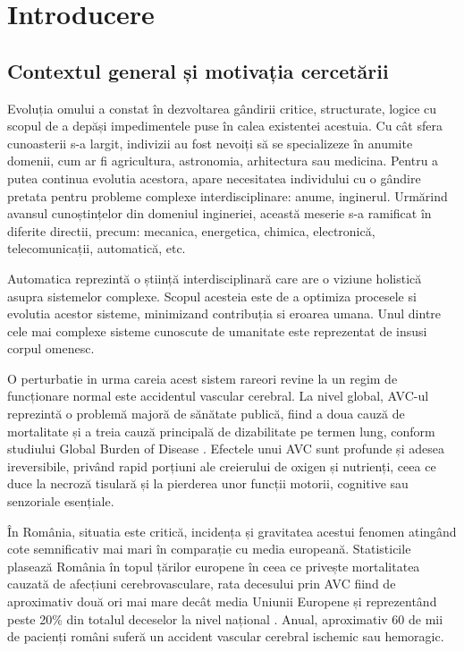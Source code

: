 \chapter{Introducere}
\section{Contextul general și motivația cercetării}
\hspace{0.75cm}Evoluția omului a constat în dezvoltarea gândirii critice, structurate, logice cu scopul de a depăși 
impedimentele puse în calea existentei acestuia. 
Cu cât sfera cunoasterii s-a largit, indivizii au fost nevoiți să se specializeze în anumite domenii,
cum ar fi agricultura, astronomia, arhitectura sau medicina. 
Pentru a putea continua evolutia acestora, apare necesitatea individului cu o 
gândire pretata pentru probleme complexe interdisciplinare: anume, inginerul. 
Urmărind avansul cunoștințelor din domeniul ingineriei, această 
meserie s-a ramificat în diferite directii, precum: mecanica, energetica, chimica, electronică, telecomunicații, 
automatică, etc.

\hspace{0.75cm}Automatica reprezintă o știință interdisciplinară care are o viziune holistică asupra sistemelor complexe. 
Scopul acesteia este de a optimiza procesele si evolutia acestor sisteme, minimizand contribuția si eroarea umana.
Unul dintre cele mai complexe sisteme cunoscute de umanitate este reprezentat de insusi corpul omenesc. 

\hspace{0.75cm}O perturbatie in urma careia acest sistem rareori revine la un regim de funcționare normal  
este accidentul vascular cerebral. La nivel global, AVC-ul reprezintă o problemă majoră de sănătate publică, 
fiind a doua cauză de mortalitate și a treia cauză principală de dizabilitate pe termen lung, conform studiului 
Global Burden of Disease \cite{gbd2021}. Efectele unui AVC sunt profunde și adesea ireversibile, 
privând rapid porțiuni ale creierului de oxigen și nutrienți,
ceea ce duce la necroză tisulară și la pierderea unor funcții motorii, cognitive sau senzoriale esențiale.

\hspace{0.75cm}În România, situatia este critică, incidența și gravitatea acestui fenomen atingând cote semnificativ
mai mari  în comparație cu media europeană. Statisticile plasează România în topul țărilor europene în ceea ce 
privește mortalitatea cauzată de afecțiuni cerebrovasculare, rata decesului prin AVC fiind de aproximativ două ori
mai mare decât media Uniunii Europene și reprezentând peste 20\% din totalul deceselor la nivel național 
\cite{romania_stats}. Anual, aproximativ 60 de mii de pacienți români suferă un accident vascular cerebral ischemic sau hemoragic. 

